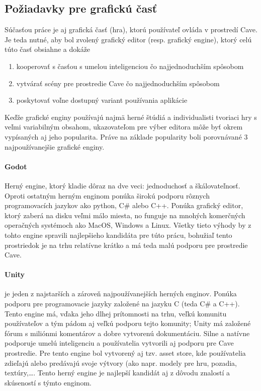 \subsection{Požiadavky pre grafickú časť}\label{subsec:requirements-game}

Súčasťou práce je aj grafická časť (hra), ktorú používateľ ovláda v prostredí Cave.
Je teda nutné, aby bol zvolený grafický editor (resp. grafický engine), ktorý celú túto časť obsiahne a dokáže
\begin{enumerate}
    \item kooperovať s časťou s umelou inteligenciou čo najjednoduchším spôsobom
    \item vytvárať scény pre prostredie Cave čo najjednoduchším spôsobom
    \item poskytovať voľne dostupný variant používania aplikácie
\end{enumerate}
Keďže grafické enginy používajú najmä herné štúdiá a individualisti tvoriaci hry s veľmi variabilným obsahom,
ukazovateľom pre výber editora môže byť okrem vypísaných aj jeho popularita.
Práve na základe popularity\cite{best_3d_game_engines} boli porovnávané 3 najpoužívanejšie grafické enginy.

\paragraph{Godot}\cite{game_engine_godot}
Herný engine, ktorý kladie dôraz na dve veci: jednoduchosť a škálovateľnosť.
Oproti ostatným herným enginom ponúka širokú podporu rôznych programovacích jazykov ako python, C\# alebo C++.
Ponúka grafický editor, ktorý zaberá na disku veľmi málo miesta, no funguje na mnohých komerčných operačných systémoch
ako MacOS, Windows a Linux.
Všetky tieto výhody by z tohto engine spravili najlepšieho kandidáta pre túto prácu, bohužiaľ tento prostriedok je na
trhu relatívne krátko a má teda malú podporu pre prostredie Cave.

\paragraph{Unity}\cite{game_engine_unity}
je jeden z najstarších a zároveň najpoužívanejších herných enginov.
Ponúka podporu pre programovacie jazyky založené na jazyku C (teda C\# a C++).
Tento engine má, vďaka jeho dlhej prítomnosti na trhu, veľkú komunitu používateľov a tým pádom aj veľkú podporu tejto
komunity;
Unity má založené fórum s miliónmi komentárov a dobre vytvorenú dokumentáciu.
Silne a natívne podporuje umelú inteligenciu\cite{game_engine_unity_ml_agents} a používatelia vytvorili aj podporu pre
Cave prostredie\cite{game_engine_unity_kave}.
Pre tento engine bol vytvorený aj tzv. asset store, kde používatelia zdieľajú alebo predávajú svoje výtvory (ako napr.
modely pre hru, pozadia, textúry,\dots.
Tento herný engine je najlepší kandidát aj z dôvodu znalostí a skúseností s týmto enginom.

